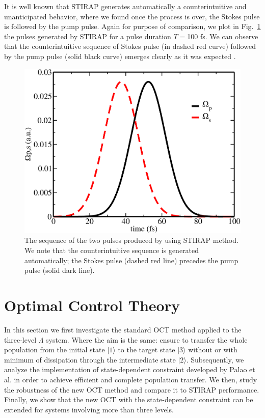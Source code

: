 \documentclass[]{interact}
\theoremstyle{plain}%
\theoremstyle{definition}
\theoremstyle{remark}
\begin{document}
It is well known that STIRAP generates automatically a counterintuitive 
and unanticipated behavior, where we found once the process is over, the 
Stokes pulse is followed by the pump pulse. 
Again for purpose of comparison, we plot in Fig.~\ref{fig:Pulses-STIRAP} the 
pulses generated by 
STIRAP for a pulse duration $T=$100 fs. 
We can observe that the 
counterintuitive sequence of Stokes pulse 
(in dashed red curve) followed by the pump pulse (solid black curve) emerges 
clearly as it was expected \cite{Vitanov}.
\begin{figure}[h!]
\centering
\includegraphics[width=0.7\linewidth]{Figure3}
\caption{The sequence of the two pulses produced by using STIRAP method. We 
note that the counterintuitive sequence 
is generated automatically; the Stokes pulse (dashed red line) precedes the 
pump pulse (solid dark line).
\label{fig:Pulses-STIRAP}}
\end{figure}
\section{Optimal Control Theory}
In this section we first investigate the standard OCT method applied to the 
three-level $\Lambda$ system. Where the aim is the same: ensure to transfer the 
whole  population from the initial state $|1\rangle$ to the target state 
$|3\rangle$ without or with minimum of dissipation through the intermediate 
state $|2\rangle$. 
Subsequently, we analyze the implementation of state-dependent constraint 
developed by Palao et al. \cite{Koch}  in order to achieve efficient and 
complete 
population transfer. We then, study the robustness of the new OCT
method and compare it to STIRAP performance. Finally, we show that the new OCT 
with the state-dependent constraint 
can be extended for systems involving more than three levels.
\end{document}
